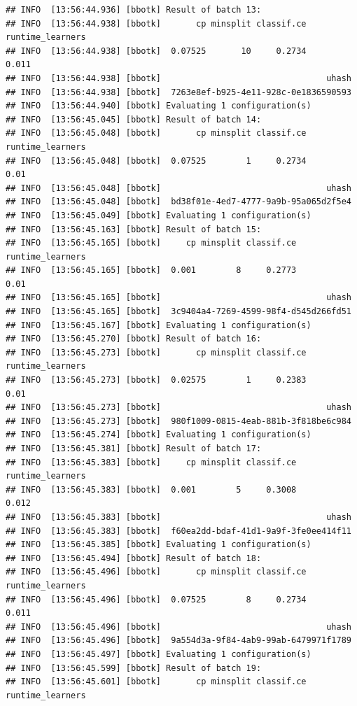 \documentclass[
]{scrbook}
\begin{document}
\begin{verbatim}
## INFO  [13:56:44.936] [bbotk] Result of batch 13: 
## INFO  [13:56:44.938] [bbotk]       cp minsplit classif.ce runtime_learners 
## INFO  [13:56:44.938] [bbotk]  0.07525       10     0.2734            0.011 
## INFO  [13:56:44.938] [bbotk]                                 uhash 
## INFO  [13:56:44.938] [bbotk]  7263e8ef-b925-4e11-928c-0e1836590593 
## INFO  [13:56:44.940] [bbotk] Evaluating 1 configuration(s) 
## INFO  [13:56:45.045] [bbotk] Result of batch 14: 
## INFO  [13:56:45.048] [bbotk]       cp minsplit classif.ce runtime_learners 
## INFO  [13:56:45.048] [bbotk]  0.07525        1     0.2734             0.01 
## INFO  [13:56:45.048] [bbotk]                                 uhash 
## INFO  [13:56:45.048] [bbotk]  bd38f01e-4ed7-4777-9a9b-95a065d2f5e4 
## INFO  [13:56:45.049] [bbotk] Evaluating 1 configuration(s) 
## INFO  [13:56:45.163] [bbotk] Result of batch 15: 
## INFO  [13:56:45.165] [bbotk]     cp minsplit classif.ce runtime_learners 
## INFO  [13:56:45.165] [bbotk]  0.001        8     0.2773             0.01 
## INFO  [13:56:45.165] [bbotk]                                 uhash 
## INFO  [13:56:45.165] [bbotk]  3c9404a4-7269-4599-98f4-d545d266fd51 
## INFO  [13:56:45.167] [bbotk] Evaluating 1 configuration(s) 
## INFO  [13:56:45.270] [bbotk] Result of batch 16: 
## INFO  [13:56:45.273] [bbotk]       cp minsplit classif.ce runtime_learners 
## INFO  [13:56:45.273] [bbotk]  0.02575        1     0.2383             0.01 
## INFO  [13:56:45.273] [bbotk]                                 uhash 
## INFO  [13:56:45.273] [bbotk]  980f1009-0815-4eab-881b-3f818be6c984 
## INFO  [13:56:45.274] [bbotk] Evaluating 1 configuration(s) 
## INFO  [13:56:45.381] [bbotk] Result of batch 17: 
## INFO  [13:56:45.383] [bbotk]     cp minsplit classif.ce runtime_learners 
## INFO  [13:56:45.383] [bbotk]  0.001        5     0.3008            0.012 
## INFO  [13:56:45.383] [bbotk]                                 uhash 
## INFO  [13:56:45.383] [bbotk]  f60ea2dd-bdaf-41d1-9a9f-3fe0ee414f11 
## INFO  [13:56:45.385] [bbotk] Evaluating 1 configuration(s) 
## INFO  [13:56:45.494] [bbotk] Result of batch 18: 
## INFO  [13:56:45.496] [bbotk]       cp minsplit classif.ce runtime_learners 
## INFO  [13:56:45.496] [bbotk]  0.07525        8     0.2734            0.011 
## INFO  [13:56:45.496] [bbotk]                                 uhash 
## INFO  [13:56:45.496] [bbotk]  9a554d3a-9f84-4ab9-99ab-6479971f1789 
## INFO  [13:56:45.497] [bbotk] Evaluating 1 configuration(s) 
## INFO  [13:56:45.599] [bbotk] Result of batch 19: 
## INFO  [13:56:45.601] [bbotk]       cp minsplit classif.ce runtime_learners 

\end{verbatim}
\end{document}
